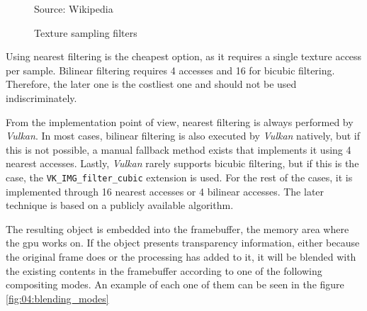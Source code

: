 \documentclass[../main.tex]{subfiles}
\begin{document}
\begin{figure}[htbp]
    \centering
    
    Source: Wikipedia
    \caption{Texture sampling filters}
    \label{fig:04:texture_sampling2}
\end{figure}

Using nearest filtering is the cheapest option, as it requires a single texture access per sample. Bilinear filtering requires 4 accesses and 16 for bicubic filtering. Therefore, the later one is the costliest one and should not be used indiscriminately.\newline

From the implementation point of view, nearest filtering is always performed by \textit{Vulkan}. In most cases, bilinear filtering is also executed by \textit{Vulkan} natively, but if this is not possible, a manual fallback method exists that implements it using 4 nearest accesses. Lastly, \textit{Vulkan} rarely supports bicubic filtering, but if this is the case, the \texttt{VK\_IMG\_filter\_cubic} extension is used. For the rest of the cases, it is implemented through 16 nearest accesses or 4 bilinear accesses. The later technique is based on a publicly available algorithm\cite{bicubicGlsl}.\newline

The resulting object is embedded into the framebuffer, the memory area where the \gls{gpu} works on. If the object presents transparency information, either because the original frame does or the processing has added to it, it will be blended with the existing contents in the framebuffer according to one of the following compositing modes. An example of each one of them can be seen in the figure \ref{fig:04:blending_modes}
\end{document}
